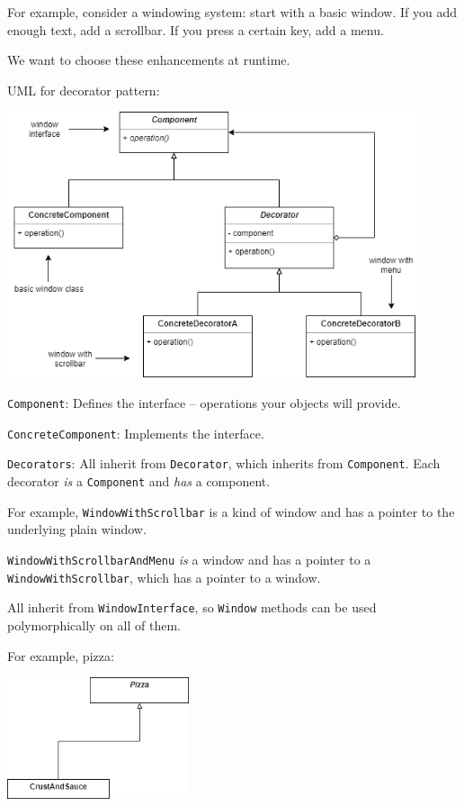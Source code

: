 \documentclass[11pt]{article}
\theoremstyle{definition}
\begin{document}
For example, consider a windowing system: start with a basic window. If you add enough text, add a scrollbar. If you press a certain key, add a menu. 

We want to choose these enhancements at runtime.

UML for decorator pattern:
\begin{center}
\includegraphics[width=0.9\textwidth]{images/decoratorUML.png}
\end{center}

{\tt Component}: Defines the interface -- operations your objects will provide.

{\tt ConcreteComponent}: Implements the interface.

{\tt Decorators}: All inherit from {\tt Decorator}, which inherits from {\tt Component}. Each decorator \emph{is} a {\tt Component} and \emph{has} a component.

For example, {\tt WindowWithScrollbar} is a kind of window and has a pointer to the underlying plain window.

{\tt WindowWithScrollbarAndMenu} \emph{is} a window and has a pointer to a {\tt WindowWithScrollbar}, which has a pointer to a window.

All inherit from {\tt WindowInterface}, so {\tt Window} methods can be used polymorphically on all of them.

For example, pizza:
\begin{center}
\includegraphics[width=0.4\textwidth]{images/pizza1.png}
\end{center}
\end{document}
